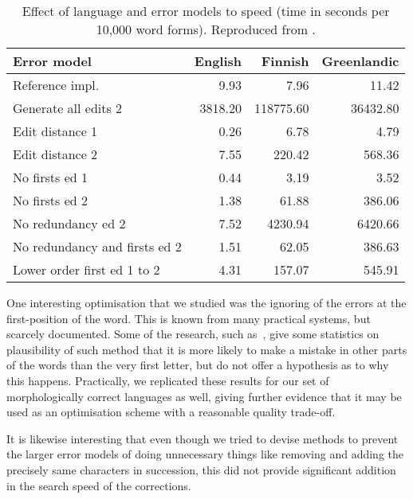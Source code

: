 \documentclass[officiallayout]{unihelcompling}
\begin{document}
\begin{table}
    \centering
\begin{tabular}{|l|rrr|}
\hline
\bf Error model & \bf English & \bf Finnish & \bf Greenlandic \\ 
\hline
Reference impl. &
9.93&7.96&11.42
\\
Generate all edits 2 & 
3818.20&118775.60&36432.80
\\
\hline
Edit distance 1 &
0.26&6.78&4.79
\\
Edit distance 2 &
7.55&220.42&568.36
\\
No firsts ed 1 & 
0.44&3.19&3.52
\\
No firsts ed 2 &
1.38&61.88&386.06
\\
No redundancy ed 2 &
7.52&4230.94&6420.66
\\
No redundancy and firsts ed 2 &
1.51&62.05&386.63
\\
Lower order first ed 1 to 2 &
4.31&157.07&545.91
\\
\hline
\end{tabular}

    \caption{Effect of language and error models to speed (time in seconds per 
        10,000 word forms). Reproduced from .
    \label{table:fsmnlp-2012-repro}}
\end{table}

One interesting optimisation that we studied was the ignoring of the errors at
the first-position of the word. This is known from many practical systems, but
scarcely documented. Some of the research, such as~\citet{bhagat2007spelling},
give some statistics on plausibility of such method that it is more likely to
make a mistake in other parts of the words than the very first letter, but do
not offer a hypothesis as to why this happens.  Practically, we replicated
these results for our set of morphologically correct languages as well, giving
further evidence that it may be used as an optimisation scheme with a
reasonable quality trade-off.

It is likewise interesting that even though we tried to devise methods to
prevent the larger error models of doing unnecessary things like removing and
adding the precisely same characters in succession, this did not provide
significant addition in the search speed of the corrections.
\end{document}
